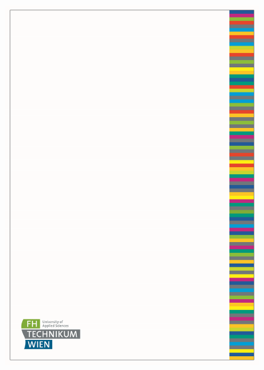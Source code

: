 \documentclass[a4paper]{article}
\begin{document}

    
    \begin{figure}[h!] %
		\includegraphics[width=\linewidth]{Image/Titelblatt.png}
	\end{figure}
    


    \newpage
    \tableofcontents
    \newpage

\end{document}
